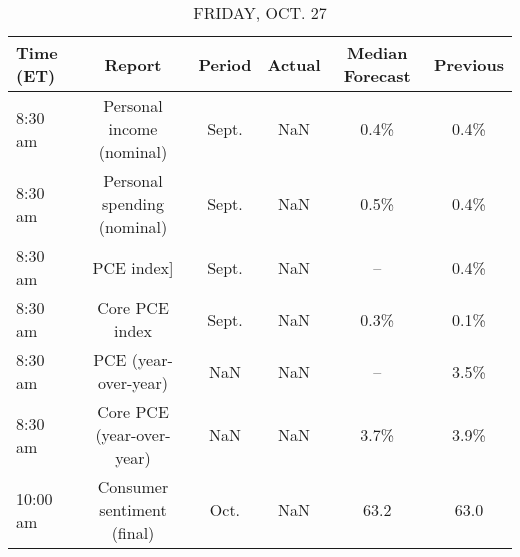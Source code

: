 \documentclass{article}%
\begin{document}
\begin{table}[htbp]%
\caption{FRIDAY, OCT. 27}%
\centering%
\begin{adjustbox}{width=1\textwidth}%
\begin{tabular}{lccccc}
\toprule
Time (ET) &                      Report & Period & Actual & Median Forecast & Previous \\
\midrule
  8:30 am &   Personal income (nominal) &  Sept. &    NaN &            0.4\% &     0.4\% \\
  8:30 am & Personal spending (nominal) &  Sept. &    NaN &            0.5\% &     0.4\% \\
  8:30 am &                  PCE index] &  Sept. &    NaN &              -- &     0.4\% \\
  8:30 am &              Core PCE index &  Sept. &    NaN &            0.3\% &     0.1\% \\
  8:30 am &        PCE (year-over-year) &    NaN &    NaN &              -- &     3.5\% \\
  8:30 am &   Core PCE (year-over-year) &    NaN &    NaN &            3.7\% &     3.9\% \\
 10:00 am &  Consumer sentiment (final) &   Oct. &    NaN &            63.2 &     63.0 \\
\bottomrule
\end{tabular}
%
\end{adjustbox}%
\end{table}
\end{document}
